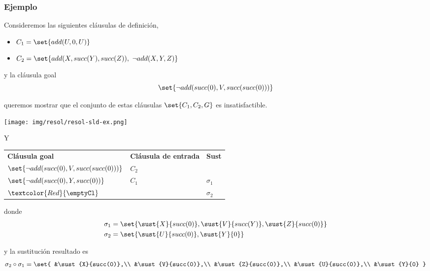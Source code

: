 \documentclass{report}
\theoremstyle{definition} %
\newcommand{\changed}[1]{\textcolor{Red}{#1}}
\newcommand{\comp}[2]{#1 \circ #2}
\begin{document}
\subsubsection{Ejemplo}

Consideremos las siguientes cláusulas de definición,

\begin{itemize}
    \item $C_1 = \set{add(U, 0, U)}$
    \item $C_2 = \set{add(X, succ(Y), succ(Z)),\ \neg add(X, Y, Z)}$
\end{itemize}

y la cláusula goal
\[
    \set{\neg add(succ(0), V, succ(succ(0)))}
\]

queremos mostrar que el conjunto de estas cláusulas $\set{C_1, C_2, G}$ es
insatisfactible.

\begin{center}
    \texttt{[image: img/resol/resol-sld-ex.png]}
\end{center}

Y 

\begin{center}
    \begin{tabular}{ lll }
        \textbf{Cláusula goal}                      & \textbf{Cláusula de entrada} & \textbf{Sust} \\
        $\set{\neg add(succ(0), V, succ(succ(0)))}$ & $C_2$                        &               \\
        $\set{\neg add(succ(0), Y, succ(0))}$       & $C_1$                        & $\sigma_1$    \\
        $\changed{\emptyCl}$                        &                              & $\sigma_2$
    \end{tabular}
\end{center}

donde
\begin{align*}
    \sigma_1 &= \set{\sust{X}{succ(0)}, \sust{V}{succ(Y)}, \sust{Z}{succ(0)}}\\
    \sigma_2 &= \set{\sust{U}{succ(0)}, \sust{Y}{0}}
\end{align*}

y la sustitución resultado es
\begin{align*}
    \comp{\sigma_2}{\sigma_1} =
    \set{
        &\sust{X}{succ(0)},\\
        &\sust{V}{succ(0)},\\
        &\sust{Z}{succ(0)},\\
        &\sust{U}{succ(0)},\\
        &\sust{Y}{0}
    }
\end{align*}
\end{document}

